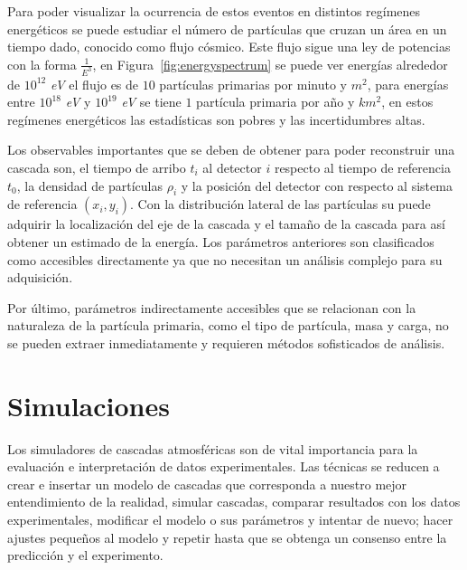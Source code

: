 
Para poder visualizar la ocurrencia de estos eventos en distintos regímenes energéticos se puede estudiar el número de partículas que cruzan un área en un tiempo dado, conocido como flujo cósmico. Este flujo sigue una ley de potencias con la forma $\frac{1}{E^3}$, en Figura~\ref{fig:energyspectrum} se puede ver  energías alrededor de $10^12$ \textit{eV} el flujo es de $10$ partículas primarias por minuto y $m^2$, para energías entre $10^18$ \textit{eV} y $10^19$ \textit{eV} se tiene $1$ partícula primaria por año y $km^2$, en estos regímenes energéticos las estadísticas son pobres y las incertidumbres altas. 

Los observables importantes que se deben de obtener para poder reconstruir una cascada son, el tiempo de arribo $t_i$ al detector $i$ respecto al tiempo de referencia $t_0$, la densidad de partículas $\rho_i$ y la posición del detector con respecto al sistema de referencia $(x_i, y_i)$.
Con la distribución lateral de las partículas su puede adquirir la localización del eje de la cascada y el tamaño de la cascada para así obtener un estimado de la energía. Los parámetros anteriores son clasificados como accesibles directamente ya que no necesitan un análisis complejo para su adquisición. 

Por último, parámetros indirectamente accesibles que se relacionan con la naturaleza de la partícula primaria, como el tipo de partícula, masa y carga, no se pueden extraer inmediatamente y requieren métodos sofisticados de análisis.

\section{Simulaciones}

Los simuladores de cascadas atmosféricas son de vital importancia para la evaluación e interpretación de datos experimentales. Las técnicas se reducen a crear e insertar un modelo de cascadas que corresponda a nuestro mejor entendimiento de la realidad, simular cascadas, comparar resultados con los datos experimentales, modificar el modelo o sus parámetros y intentar de nuevo; hacer ajustes pequeños al modelo y repetir hasta que se obtenga un consenso entre la predicción y el experimento.

